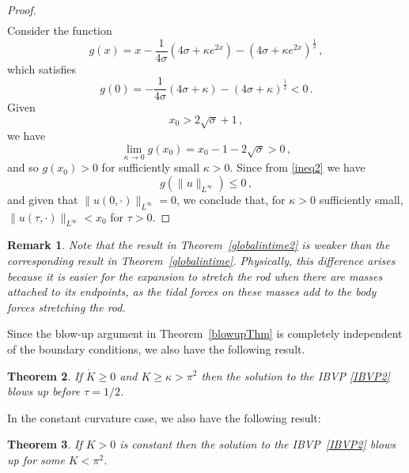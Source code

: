 \documentclass[10pt]{amsart}
\newtheorem{Thm}{Theorem}[section]
\newtheorem{Remark}[Thm]{Remark}
\begin{document}
\begin{proof}
\begin{align}
\end{align}
Consider the function
\begin{equation}
g(x) = x - \frac1{4\sigma} \left( 4\sigma + \kappa e^{2x} \right) -  \left( 4\sigma + \kappa e^{2x} \right)^\frac12 \, ,
\end{equation}
which satisfies
\begin{equation}
g(0)= - \frac1{4\sigma} \left( 4\sigma + \kappa \right) -  \left( 4\sigma + \kappa \right)^\frac12 < 0 \, .
\end{equation}
Given
\begin{equation}
x_0 > 2\sqrt{\sigma} + 1 \, ,
\end{equation}
we have
\begin{equation}
\lim_{\kappa \to 0} g(x_0) = x_0 - 1 - 2\sqrt{\sigma} > 0 \, ,
\end{equation}
and so $g(x_0)>0$ for sufficiently small $\kappa > 0$. Since from \eqref{ineq2} we have
\begin{equation}
g(\|u\|_{L^\infty}) \leq 0 \, ,
\end{equation}
and given that $\|u(0,\cdot)\|_{L^\infty}=0$, we conclude that, for $\kappa > 0$ sufficiently small, $\|u(\tau,\cdot)\|_{L^\infty}<x_0$ for $\tau>0$.
\end{proof}

\begin{Remark}
Note that the result in Theorem~\ref{globalintime2} is weaker than the corresponding result in Theorem~\ref{globalintime}. Physically, this difference arises because it is easier for the expansion to stretch the rod when there are masses attached to its endpoints, as the tidal forces on these masses add to the body forces stretching the rod.
\end{Remark}

Since the blow-up argument in Theorem~\ref{blowupThm} is completely independent of the boundary conditions, we also have the following result.

\begin{Thm}
If $\dot{K} \geq 0$ and $K \geq \kappa > \pi^2$ then the solution to the IBVP \eqref{IBVP2} blows up before $\tau=1/2$.
\end{Thm} 

In the constant curvature case, we also have the following result:

\begin{Thm}
If $K>0$ is constant then the solution to the IBVP~\eqref{IBVP2} blows up for some $K < \pi^2$.
\end{Thm}
\end{document}
